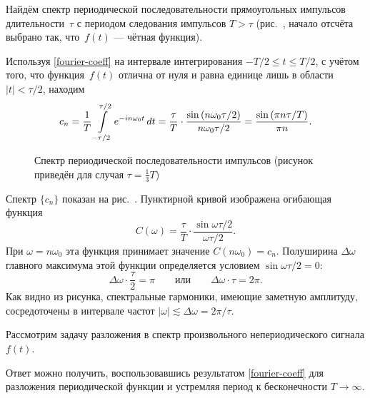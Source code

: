 \begin{lab:example}\label{example:square-zug}
Найдём спектр периодической последовательности прямоугольных
импульсов длительности~$\tau$ с периодом следования импульсов $T>\tau$
(рис.~, начало отсчёта выбрано так, что~$f(t)$ --- чётная
функция).

Используя \eqref{fourier-coeff} на интервале интегрирования
$-T/2\le t \le T/2$, с учётом того, что функция~$f(t)$ отлична от нуля и
равна единице лишь в области $|t|<\tau/2$, находим
\begin{equation}
    \eqmark{impulses-spectrum}
    c_n =\frac{1}{T}\int\limits_{-\tau/2}^{\tau/2} e^{-in\omega_0 t}\,dt
    =\frac{\tau}{T}\cdot \frac{\sin \left(n\omega_0\tau/2\right)}{n\omega_0\tau/2} =
     \frac{\sin \left(\pi n \tau/T\right)}{\pi n}.
\end{equation}

\begin{figure}[h!]
    \centering
    \caption{Спектр периодической последовательности импульсов
        (рисунок приведён для случая $\tau=\frac13 T$)}
\end{figure}

Спектр $\{c_n\}$ показан на рис.~.
Пунктирной кривой изображена огибающая функция
\begin{equation*}
    C(\omega) =\frac{\tau}{T}\cdot \frac{\sin\omega\tau/2}{\omega\tau/2}.
\end{equation*}
При $\omega=n\omega_0$ эта функция принимает значение $C(n\omega_0)=c_n$.
Полуширина $\Delta \omega$ главного максимума этой функции определяется
условием $\sin\omega\tau/2=0$:
\begin{equation*}
    \Delta\omega \cdot \frac{\tau}{2}=\pi\qquad \text{или} \qquad \Delta \omega
\cdot \tau =2\pi.
\end{equation*}
Как видно из рисунка, спектральные гармоники,
имеющие заметную амплитуду, сосредоточены в интервале частот
$|\omega|\lesssim\Delta\omega=2\pi/\tau$.
\end{lab:example}



Рассмотрим задачу разложения в спектр произвольного непериодического
сигнала $f(t)$.

Ответ можно получить, воспользовавшись результатом
\eqref{fourier-coeff} для разложения периодической функции
и устремляя период к бесконечности $T\to \infty$.

